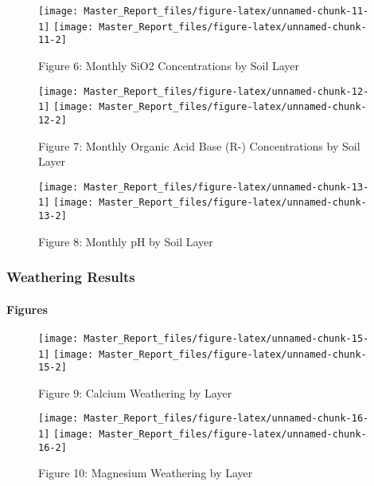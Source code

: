 \documentclass[
]{article}
\begin{document}
\begin{figure}[H]
\texttt{[image: Master\_Report\_files/figure-latex/unnamed-chunk-11-1]} \texttt{[image: Master\_Report\_files/figure-latex/unnamed-chunk-11-2]} \caption{Figure 6: Monthly SiO2 Concentrations by Soil Layer}\label{fig:unnamed-chunk-11}
\end{figure}

\begin{figure}[H]
\texttt{[image: Master\_Report\_files/figure-latex/unnamed-chunk-12-1]} \texttt{[image: Master\_Report\_files/figure-latex/unnamed-chunk-12-2]} \caption{Figure 7: Monthly Organic Acid Base (R-) Concentrations by Soil Layer}\label{fig:unnamed-chunk-12}
\end{figure}

\begin{figure}[H]
\texttt{[image: Master\_Report\_files/figure-latex/unnamed-chunk-13-1]} \texttt{[image: Master\_Report\_files/figure-latex/unnamed-chunk-13-2]} \caption{Figure 8: Monthly pH by Soil Layer}\label{fig:unnamed-chunk-13}
\end{figure}

\hypertarget{weathering-results}{%
\subsubsection{Weathering Results}\label{weathering-results}}

\hypertarget{figures}{%
\paragraph{Figures}\label{figures}}

\begin{figure}[H]
\texttt{[image: Master\_Report\_files/figure-latex/unnamed-chunk-15-1]} \texttt{[image: Master\_Report\_files/figure-latex/unnamed-chunk-15-2]} \caption{Figure 9: Calcium Weathering by Layer}\label{fig:unnamed-chunk-15}
\end{figure}

\begin{figure}[H]
\texttt{[image: Master\_Report\_files/figure-latex/unnamed-chunk-16-1]} \texttt{[image: Master\_Report\_files/figure-latex/unnamed-chunk-16-2]} \caption{Figure 10: Magnesium Weathering by Layer}\label{fig:unnamed-chunk-16}
\end{figure}
\end{document}

